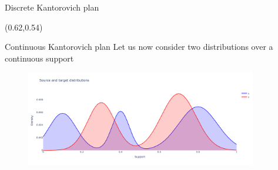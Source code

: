 \documentclass[pdf,aspectratio=169,10pt]{beamer}
\begin{document}
\begin{frame}{ Discrete Kantorovich plan}
\begin{textblock}{0.45}(0.62,0.54)
\small
{}
\end{textblock}
\end{frame}




\begin{frame}{ Continuous Kantorovich plan}
    Let us now consider two  distributions over a continuous support
\begin{minipage}{0.59\textwidth}
\begin{figure}
    \centering
        \includegraphics[width=0.9\textwidth]{../img/kantorovich_continuous_density.pdf}\hspace{2em}
    \end{figure}


\end{minipage}
\end{frame}
\end{document}
